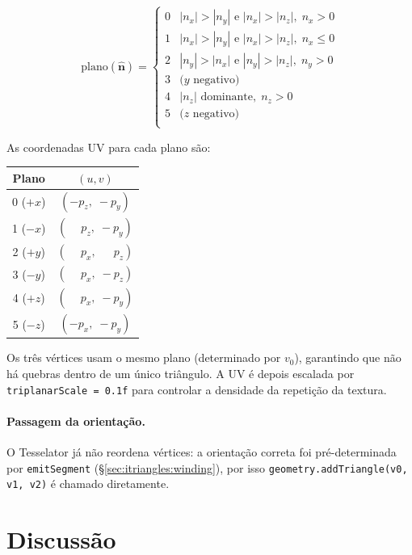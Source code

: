 \documentclass[10pt,a4paper]{article}
\begin{document}
\[
  \text{plano}(\hat{\mathbf{n}}) =
  \begin{cases}
    0 & |n_x| > |n_y| \text{ e } |n_x| > |n_z|, \; n_x > 0\\
    1 & |n_x| > |n_y| \text{ e } |n_x| > |n_z|, \; n_x \leq 0\\
    2 & |n_y| > |n_x| \text{ e } |n_y| > |n_z|, \; n_y > 0\\
    3 & \text{(} y \text{ negativo)}\\
    4 & |n_z|\text{ dominante}, \; n_z > 0\\
    5 & \text{(} z \text{ negativo)}\\
  \end{cases}
\]

As coordenadas UV para cada plano são:
\begin{center}
\begin{tabular}{c|c}
  \toprule
  Plano & $(u, v)$ \\
  \midrule
  0 ($+x$) & $(-p_z,\; -p_y)$ \\
  1 ($-x$) & $(\phantom{-}p_z,\; -p_y)$ \\
  2 ($+y$) & $(\phantom{-}p_x,\; \phantom{-}p_z)$ \\
  3 ($-y$) & $(\phantom{-}p_x,\; -p_z)$ \\
  4 ($+z$) & $(\phantom{-}p_x,\; -p_y)$ \\
  5 ($-z$) & $(-p_x,\; -p_y)$ \\
  \bottomrule
\end{tabular}
\end{center}
Os três vértices usam o mesmo plano (determinado por $v_0$),
garantindo que não há quebras dentro de um único triângulo. A UV é
depois escalada por \lstinline{triplanarScale = 0.1f} para controlar
a densidade da repetição da textura.

\paragraph{Passagem da orientação.}
O Tesselator já não reordena vértices: a orientação correta foi
pré-determinada por \lstinline{emitSegment}
(\S\ref{sec:itriangles:winding}), por isso
\lstinline{geometry.addTriangle(v0, v1, v2)} é chamado diretamente.

\section{Discussão}
\label{sec:discussion}
\end{document}
